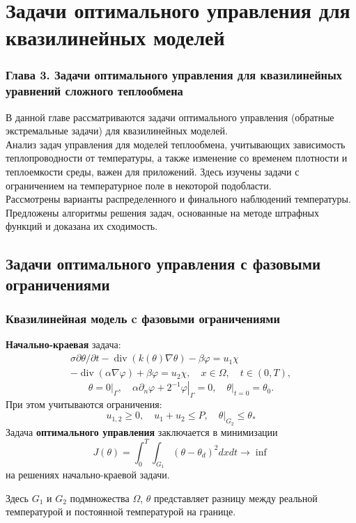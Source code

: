 \section{Задачи оптимального управления для квазилинейных моделей}\label{sec:opt}
\begin{frame}
    \frametitle{Глава 3. Задачи оптимального управления для квазилинейных уравнений сложного теплообмена}
    В данной главе рассматриваются задачи оптимального управления
    (обратные экстремальные задачи) для квазилинейных моделей.
    \\
    Анализ задач управления для моделей теплообмена, учитывающих зависимость
    теплопроводности от температуры, а также изменение со временем плотности
    и теплоемкости среды, важен для приложений.
    Здесь изучены задачи с ограничением на температурное поле в некоторой подобласти.
    \\
    Рассмотрены варианты распределенного и финального наблюдений температуры.
    \\
    Предложены алгоритмы решения задач, основанные на методе штрафных функций и доказана
    их сходимость.
\end{frame}

\subsection{Задачи оптимального управления с фазовыми ограничениями}\label{subsec:opt-phase}
\begin{frame}
    \frametitle{Квазилинейная модель c фазовыми ограничениями}
    \textbf{Начально-краевая} задача:
    \begin{equation}
        \label{eq:3_2:1}
        \begin{gathered}
            \sigma \partial \theta / \partial t-\operatorname{div}(k(\theta)
            \nabla \theta)-\beta \varphi=u_{1} \chi \\
            -\operatorname{div}(\alpha \nabla \varphi)+\beta \varphi=u_{2}
            \chi, \quad x \in \Omega, \quad t \in(0, T),
        \end{gathered}
    \end{equation}
    \begin{equation}
        \label{eq:3_2:2}
        \theta=\left.0\right|_{\Gamma},
        \quad \alpha \partial_{n} \varphi
        +\left.2^{-1} \varphi\right|_{\Gamma}=0,
        \left.\quad \theta\right|_{t=0}=\theta_{0}.
    \end{equation}
    При этом учитываются ограничения:
    \[ u_{1,2} \geq 0, \quad u_{1}+u_{2} \leq P, \left.\quad \theta\right|_{G_{2}} \leq \theta_{*} \]
    Задача \textbf{оптимального управления} заключается в минимизации
    \[ J(\theta)=\int_{0}^{T} \int_{G_{1}}\left(\theta-\theta_{d}\right)^{2} dx dt \rightarrow \inf \]
    на решениях начально-краевой задачи.

    Здесь $G_{1}$ и $G_{2}$ подмножества $\Omega$, $\theta$
    представляет разницу между реальной температурой
    и постоянной температурой на границе.
\end{frame}

